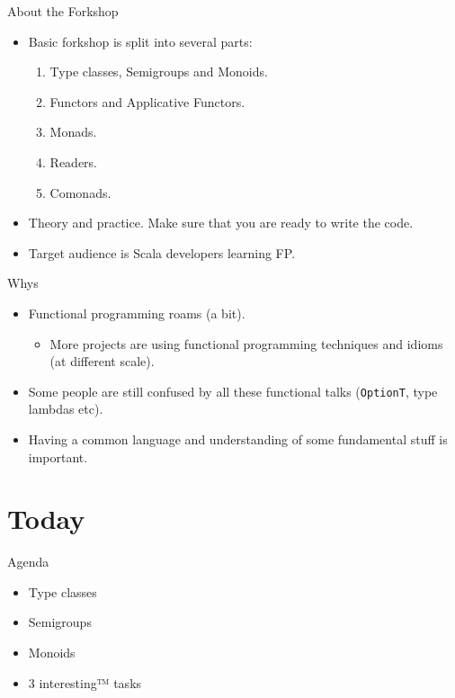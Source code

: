 \documentclass[presentation,aspectratio=169,smaller]{beamer}
\begin{document}
\begin{frame}[label={sec:orgc04d2eb}]{About the Forkshop}
\begin{itemize}
\item Basic forkshop is split into several parts:
\begin{enumerate}
\item Type classes, Semigroups and Monoids.
\item Functors and Applicative Functors.
\item Monads.
\item Readers.
\item Comonads.
\end{enumerate}
\item Theory and practice. Make sure that you are ready to write the code.
\item Target audience is Scala developers learning FP.
\end{itemize}
\end{frame}

\begin{frame}[label={sec:org59ccf72},fragile]{Whys}
 \begin{itemize}
\item <1-> Functional programming roams (a bit).
\begin{itemize}
\item More projects are using functional programming techniques and idioms (at
different scale).
\end{itemize}
\item <2-> Some people are still confused by all these functional talks (\texttt{OptionT}, type
lambdas etc).
\item <3-> Having a common language and understanding of some fundamental stuff is
important.
\end{itemize}
\end{frame}

\section*{Today}
\label{sec:orgc5d05c1}
\begin{frame}[label={sec:orgd8c07b9}]{Agenda}
\begin{itemize}
\item Type classes
\item Semigroups
\item Monoids
\item 3 interesting™ tasks
\end{itemize}
\end{frame}
\end{document}
